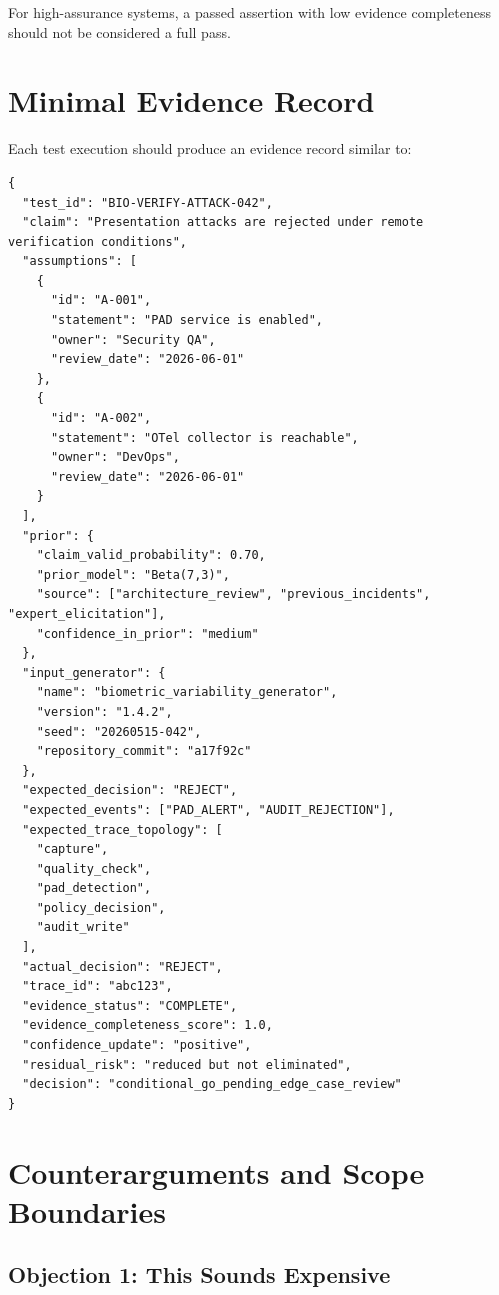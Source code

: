 \documentclass[11pt,a4paper]{article}
\begin{document}
For high-assurance systems, a passed assertion with low evidence completeness should not be considered a full pass.

\section{Minimal Evidence Record}

Each test execution should produce an evidence record similar to:

\begin{lstlisting}
{
  "test_id": "BIO-VERIFY-ATTACK-042",
  "claim": "Presentation attacks are rejected under remote verification conditions",
  "assumptions": [
    {
      "id": "A-001",
      "statement": "PAD service is enabled",
      "owner": "Security QA",
      "review_date": "2026-06-01"
    },
    {
      "id": "A-002",
      "statement": "OTel collector is reachable",
      "owner": "DevOps",
      "review_date": "2026-06-01"
    }
  ],
  "prior": {
    "claim_valid_probability": 0.70,
    "prior_model": "Beta(7,3)",
    "source": ["architecture_review", "previous_incidents", "expert_elicitation"],
    "confidence_in_prior": "medium"
  },
  "input_generator": {
    "name": "biometric_variability_generator",
    "version": "1.4.2",
    "seed": "20260515-042",
    "repository_commit": "a17f92c"
  },
  "expected_decision": "REJECT",
  "expected_events": ["PAD_ALERT", "AUDIT_REJECTION"],
  "expected_trace_topology": [
    "capture",
    "quality_check",
    "pad_detection",
    "policy_decision",
    "audit_write"
  ],
  "actual_decision": "REJECT",
  "trace_id": "abc123",
  "evidence_status": "COMPLETE",
  "evidence_completeness_score": 1.0,
  "confidence_update": "positive",
  "residual_risk": "reduced but not eliminated",
  "decision": "conditional_go_pending_edge_case_review"
}
\end{lstlisting}

\section{Counterarguments and Scope Boundaries}

\subsection{Objection 1: This Sounds Expensive}
\end{document}
